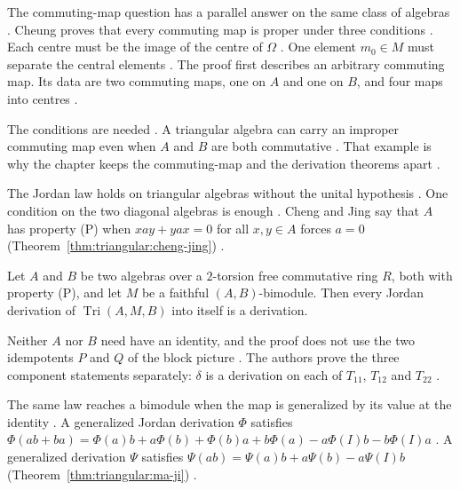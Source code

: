 The commuting-map question has a parallel answer on the same class of algebras
\cite[Theorem~2, p.~124]{Cheung2001}. Cheung proves that every commuting map
is proper under three conditions \cite[Theorem~2, p.~124]{Cheung2001}. Each
centre must be the image of the centre of $\Omega$
\cite[Theorem~2, p.~124]{Cheung2001}. One element $m_0\in M$
must separate the central elements \cite[Theorem~2, p.~124]{Cheung2001}. The
proof first describes an arbitrary commuting map. Its data are two commuting
maps, one on $A$ and one on $B$, and four maps into centres
\cite[Proposition~4, p.~121]{Cheung2001}.

The conditions are needed \cite[Example~1, p.~123]{Cheung2001}. A triangular
algebra can carry an improper commuting map even when $A$ and $B$ are both
commutative \cite[Example~1, p.~123]{Cheung2001}. That example is why the
chapter keeps the commuting-map and the derivation theorems apart
\cite[Example~1, p.~123]{Cheung2001}.

The Jordan law holds on triangular algebras without the unital hypothesis
\cite[Theorem~2.10, p.~5]{ChengJing2007}. One condition on the two diagonal
algebras is enough \cite[Theorem~2.10, p.~5]{ChengJing2007}. Cheng and Jing
say that $A$ has property (P) when $xay+yax=0$ for all $x,y\in A$ forces $a=0$
(Theorem~\ref{thm:triangular:cheng-jing})
\cite[p.~2]{ChengJing2007}.\begin{theorem}\label{thm:triangular:cheng-jing} Let $A$ and $B$ be two
algebras over a $2$-torsion free commutative ring $R$, both with property (P),
and let $M$ be a faithful $(A,B)$-bimodule. Then every Jordan derivation of
$\operatorname{Tri}(A,M,B)$ into itself is a derivation. \end{theorem}

Neither $A$ nor $B$ need have an identity, and the proof does not use the two
idempotents $P$ and $Q$ of the block picture \cite[p.~1]{ChengJing2007}. The
authors prove the three component statements separately: $\delta$ is a
derivation on each of $T_{11}$, $T_{12}$ and $T_{22}$
\cite[Lemmas~2.7--2.9, pp.~4--5]{ChengJing2007}.

The same law reaches a bimodule when the map is generalized by its value at
the identity \cite[Theorem~2.4, p.~362]{MaJi2007}. A generalized Jordan
derivation $\Phi$ satisfies
$\Phi(ab+ba)=\Phi(a)b+a\Phi(b)+\Phi(b)a+b\Phi(a)-a\Phi(I)b-b\Phi(I)a$
\cite[p.~355]{MaJi2007}. A generalized derivation $\Psi$ satisfies
$\Psi(ab)=\Psi(a)b+a\Psi(b)-a\Psi(I)b$ (Theorem~\ref{thm:triangular:ma-ji})
\cite[p.~355]{MaJi2007}.

